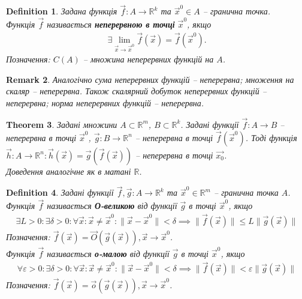 \documentclass[a4paper, 10pt]{article}
\theoremstyle{theoremdd}
\newtheorem{theorem}{Theorem}[subsection]
\theoremstyle{theoremdd}
\theoremstyle{theoremdd}
\newtheorem{definition}[theorem]{Definition}
\theoremstyle{theoremdd}
\theoremstyle{theoremdd}
\theoremstyle{theoremdd}
\theoremstyle{theoremdd}
\newtheorem{remark}[theorem]{Remark}
\theoremstyle{theoremdd}
\theoremstyle{theoremdd}
\newcommand\Norm[1]{\|#1\|}
\begin{document}
\begin{definition}
Задана функція $\vec{f} \colon A \to \mathbb{R}^k$ та $\vec{x}^0 \in A$ -- гранична точка.\\
Функція $\vec{f}$ називається \textbf{неперервною в точці} $\vec{x}^0$, якщо
\begin{align*}
\exists \lim_{\vec{x} \to \vec{x}^0} \vec{f}(\vec{x}) = \vec{f}(\vec{x}^0).
\end{align*}
Позначення: $C(A)$ -- множина неперервних функцій на $A$.
\end{definition}

\begin{remark}
Аналогічно сума неперервних функцій -- неперервна; множення на скаляр -- неперервна. Також скалярний добуток неперервних функцій -- неперервна; норма неперервних функцій -- неперервна.
\end{remark}

\begin{theorem}
Задані множини $A \subset \mathbb{R}^m$, $B \subset \mathbb{R}^k$. Задані функції $\vec{f} \colon A \to B$ -- неперервна в точці $\vec{x}^0$, $\vec{g} \colon B \to \mathbb{R}^n$ -- неперервна в точці $\vec{f}(\vec{x}^0)$. Тоді функція $\vec{h} \colon A \to \mathbb{R}^n: \vec{h}(\vec{x}) = \vec{g}(\vec{f}(\vec{x}))$ -- неперервна в точці $\vec{x_0}$.\\
\textit{Доведення аналогічне як в матані $\mathbb{R}$.}
\end{theorem}

\begin{definition}
Задані функції $\vec{f},\vec{g} \colon A \to \mathbb{R}^k$ та $\vec{x}^0 \in \mathbb{R}^m$ -- гранична точка $A$.\\
Функція $\vec{f}$ називається \textbf{О-великою} від функції $\vec{g}$ в точці $\vec{x}^0$, якщо
\begin{align*}
\exists L>0: \exists \delta > 0: \forall \vec{x}: \vec{x} \neq \vec{x}^0: \Norm{\vec{x} - \vec{x}^0} < \delta \implies \Norm{\vec{f}(\vec{x})} \leq L \Norm{\vec{g}(\vec{x})}
\end{align*}
Позначення: $\vec{f}(\vec{x}) = \vec{O}(\vec{g}(\vec{x})), \vec{x} \to \vec{x}^0$.\\
Функція $\vec{f}$ називається \textbf{о-малою} від функції $\vec{g}$ в точці $\vec{x}^0$, якщо
\begin{align*}
\forall \varepsilon>0: \exists \delta > 0: \forall \vec{x}: \vec{x} \neq \vec{x}^0: \Norm{\vec{x} - \vec{x}^0} < \delta \implies \Norm{\vec{f}(\vec{x})} < \varepsilon \Norm{\vec{g}(\vec{x})}
\end{align*}
Позначення: $\vec{f}(\vec{x}) = \vec{o}(\vec{g}(\vec{x})), \vec{x} \to \vec{x}^0$.
\end{definition}
\end{document}
